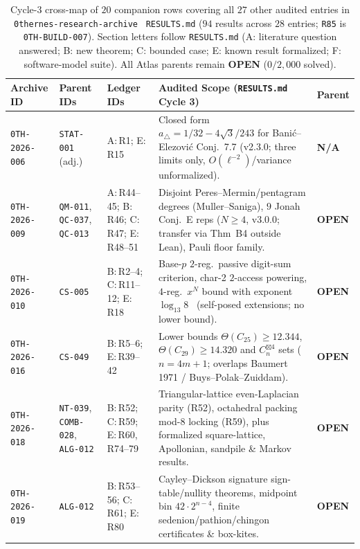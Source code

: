 \documentclass[11pt,reqno]{amsart}
\theoremstyle{plain}
\theoremstyle{definition}
\newcommand{\code}[1]{{\footnotesize\nolinkurl{#1}}}
\newcommand{\tcode}[1]{{\scriptsize\nolinkurl{#1}}}
\begin{document}
\begin{table}[t]
\centering
\caption{Cycle-3 cross-map of $20$ companion rows covering all $27$ other audited entries in \code{0thernes-research-archive}~\cite{donahue2026archive} \code{RESULTS.md} ($94$ results across $28$ entries; \code{R85} is \code{0TH-BUILD-007}). Section letters follow \code{RESULTS.md} (A: literature question answered; B: new theorem; C: bounded case; E: known result formalized; F: software-model suite). All Atlas parents remain \textbf{OPEN} ($0/2{,}000$ solved).}
\label{tab:author_preprints}
\scriptsize
\renewcommand{\arraystretch}{0.92}
\begin{tabularx}{\textwidth}{@{}P{2.35cm}P{1.80cm}P{1.75cm}YP{1.05cm}@{}}
\toprule
\textbf{Archive ID} & \textbf{Parent IDs} & \textbf{Ledger IDs} & \textbf{Audited Scope (\code{RESULTS.md} Cycle 3)} & \textbf{Parent} \\
\midrule
\tcode{0TH-2026-006} & \tcode{STAT-001} (adj.) & A:\,R1; E:\,R15 & Closed form $a_{\triangle}=1/32-4\sqrt{3}/243$ for Bani\'c--Elezovi\'c Conj.~7.7 (v2.3.0; three limits only, $O(\ell^{-2})$/variance unformalized). & \textbf{N/A} \\
\tcode{0TH-2026-009} & \tcode{QM-011}, \tcode{QC-037}, \tcode{QC-013} & A:\,R44--45; B:\,R46; C:\,R47; E:\,R48--51 & Disjoint Peres--Mermin/pentagram degrees (Muller--Saniga), $9$ Jonah Conj.~E reps ($N\!\ge\!4$, v3.0.0; transfer via Thm~B4 outside Lean), Pauli floor family. & \textbf{OPEN} \\
\tcode{0TH-2026-010} & \tcode{CS-005} & B:\,R2--4; C:\,R11--12; E:\,R18 & Base-$p$ $2$-reg.\ passive digit-sum criterion, char-2 $2$-access powering, $4$-reg.\ $x^N$ bound with exponent $\log_{13} 8$~\cite{donahue2026catalytic} (self-posed extensions; no lower bound). & \textbf{OPEN} \\
\tcode{0TH-2026-016} & \tcode{CS-049} & B:\,R5--6; E:\,R39--42 & Lower bounds $\Theta(C_{25})\!\ge\!12.344$, $\Theta(C_{29})\!\ge\!14.320$ and $C_n^{\boxtimes 4}$ sets ($n=4m+1$; overlaps Baumert 1971 / Buys--Polak--Zuiddam). & \textbf{OPEN} \\
\tcode{0TH-2026-018} & \tcode{NT-039}, \tcode{COMB-028}, \tcode{ALG-012} & B:\,R52; C:\,R59; E:\,R60, R74--79 & Triangular-lattice even-Laplacian parity (R52), octahedral packing mod-8 locking (R59), plus formalized square-lattice, Apollonian, sandpile \& Markov results. & \textbf{OPEN} \\
\tcode{0TH-2026-019} & \tcode{ALG-012} & B:\,R53--56; C:\,R61; E:\,R80 & Cayley--Dickson signature sign-table/nullity theorems, midpoint bin $42\cdot 2^{n-4}$, finite sedenion/pathion/chingon certificates \& box-kites. & \textbf{OPEN} \\

\end{tabularx}
\end{table}
\end{document}
